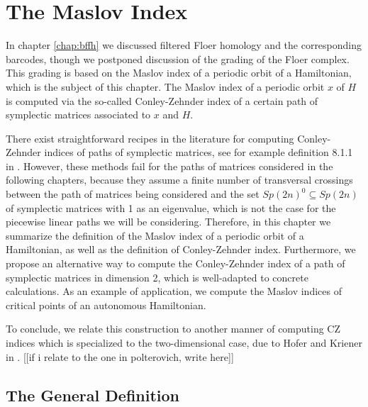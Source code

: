 \chapter{The Maslov Index}\label{chap:maslov}

In chapter \ref{chap:bffh} we discussed filtered Floer homology and the corresponding barcodes, though we postponed discussion of the grading of the Floer complex. This grading is based on the Maslov index of a periodic orbit of a Hamiltonian, which is the subject of this chapter. The Maslov index of a periodic orbit $x$ of $H$ is computed via the so-called Conley-Zehnder index of a certain path of symplectic matrices associated to $x$ and $H$.

There exist straightforward recipes in the literature for computing Conley-Zehnder indices of paths of symplectic matrices, see for example definition 8.1.1 in \cite{polterovich}. However, these methods fail for the paths of matrices considered in the following chapters, because they assume a finite number of transversal crossings between the path of matrices being considered and the set $Sp(2n)^0 \subseteq Sp(2n)$ of symplectic matrices with 1 as an eigenvalue, which is not the case for the piecewise linear paths we will be considering. Therefore, in this chapter we summarize the definition of the Maslov index of a periodic orbit of a Hamiltonian, as well as the definition of Conley-Zehnder index. Furthermore, we propose an alternative way to compute the Conley-Zehnder index of a path of symplectic matrices in dimension 2, which is well-adapted to concrete calculations. As an example of application, we compute the Maslov indices of critical points of an autonomous Hamiltonian.

To conclude, we relate this construction to another manner of computing CZ indices which is specialized to the two-dimensional case, due to Hofer and Kriener in \cite{hoferkriener}. [[if i relate to the one in polterovich, write here]]

\section{The General Definition}

